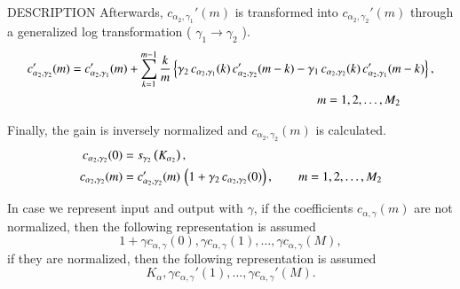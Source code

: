 \begin{qsection}{DESCRIPTION}
Afterwards, $c_{\alpha_2,\gamma_1}'(m)$ is transformed into 
$c_{\alpha_2,\gamma_2}'(m)$ through a generalized log transformation
( $\gamma_1 \rightarrow \gamma_2$ ).
\begin{align}
c_{\alpha_2,\gamma_2}'(m) &=
        c_{\alpha_2,\gamma_1}'(m)+\sum_{k=1}^{m-1} \frac{k}{m}
          \left\{ \gamma_2\,c_{\alpha_2,\gamma_1}(k)\,
          c_{\alpha_2,\gamma_2}'(m-k) 
 -\gamma_1\,c_{\alpha_2,\gamma_2}(k)\,
          c_{\alpha_2,\gamma_1}'(m-k) \right\},  \notag \\
          &\hspace{70mm} m = 1, 2, \dots, M_2 \notag
\end{align}

Finally, the gain is inversely normalized and $c_{\alpha_2,\gamma_2}(m)$
is calculated.
\begin{align}
c_{\alpha_2,\gamma_2}(0) &= 
        s_{\gamma_2}\left(K_{\alpha_2}\right), \notag \\
c_{\alpha_2,\gamma_2}(m) &= 
          c_{\alpha_2,\gamma_2}'(m)\,\left(1+\gamma_2\, 
          c_{\alpha_2,\gamma_2}(0)\right), 
          \qquad m = 1,2,\dots, M_2 \notag
\end{align}

In case we represent input and output with $\gamma$,
if the coefficients $c_{\alpha,\gamma}(m)$ are not normalized, then
the following representation is assumed
\begin{displaymath}
1+\gamma c_{\alpha,\gamma}(0), \gamma c_{\alpha,\gamma}(1), \dots, \gamma c_{\alpha,\gamma}(M),
\end{displaymath}
if they are normalized, then
the following representation is assumed
\begin{displaymath}
K_\alpha,\gamma c_{\alpha,\gamma}'(1),\dots, \gamma c_{\alpha,\gamma}'(M).
\end{displaymath}

\end{qsection}


